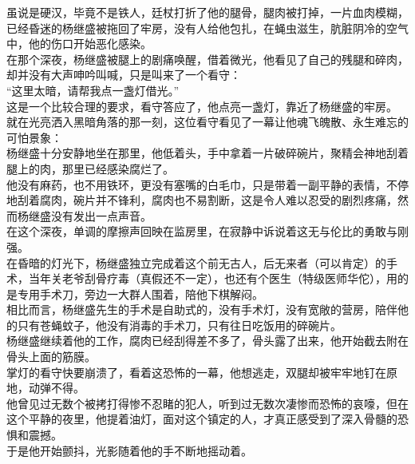 \begin{multicols}{\theparacolNo}
虽说是硬汉，毕竟不是铁人，廷杖打折了他的腿骨，腿肉被打掉，一片血肉模糊，已经昏迷的杨继盛被拖回了牢房，没有人给他包扎，在蝇虫滋生，肮脏阴冷的空气中，他的伤口开始恶化感染。\\

在那个深夜，杨继盛被腿上的剧痛唤醒，借着微光，他看见了自己的残腿和碎肉，却并没有大声呻吟叫喊，只是叫来了一个看守：\\

“这里太暗，请帮我点一盏灯借光。”\\

这是一个比较合理的要求，看守答应了，他点亮一盏灯，靠近了杨继盛的牢房。\\

就在光亮洒入黑暗角落的那一刻，这位看守看见了一幕让他魂飞魄散、永生难忘的可怕景象：\\

杨继盛十分安静地坐在那里，他低着头，手中拿着一片破碎碗片，聚精会神地刮着腿上的肉，那里已经感染腐烂了。\\

他没有麻药，也不用铁环，更没有塞嘴的白毛巾，只是带着一副平静的表情，不停地刮着腐肉，碗片并不锋利，腐肉也不易割断，这是令人难以忍受的剧烈疼痛，然而杨继盛没有发出一点声音。\\

在这个深夜，单调的摩擦声回映在监房里，在寂静中诉说着这无与伦比的勇敢与刚强。\\

在昏暗的灯光下，杨继盛独立完成着这个前无古人，后无来者（可以肯定）的手术，当年关老爷刮骨疗毒（真假还不一定），也还有个医生（特级医师华佗），用的是专用手术刀，旁边一大群人围着，陪他下棋解闷。\\

相比而言，杨继盛先生的手术是自助式的，没有手术灯，没有宽敞的营房，陪伴他的只有苍蝇蚊子，他没有消毒的手术刀，只有往日吃饭用的碎碗片。\\

杨继盛继续着他的工作，腐肉已经刮得差不多了，骨头露了出来，他开始截去附在骨头上面的筋膜。\\

掌灯的看守快要崩溃了，看着这恐怖的一幕，他想逃走，双腿却被牢牢地钉在原地，动弹不得。\\

他曾见过无数个被拷打得惨不忍睹的犯人，听到过无数次凄惨而恐怖的哀嚎，但在这个平静的夜里，他提着油灯，面对这个镇定的人，才真正感受到了深入骨髓的恐惧和震撼。\\

于是他开始颤抖，光影随着他的手不断地摇动着。\\


\end{multicols}

